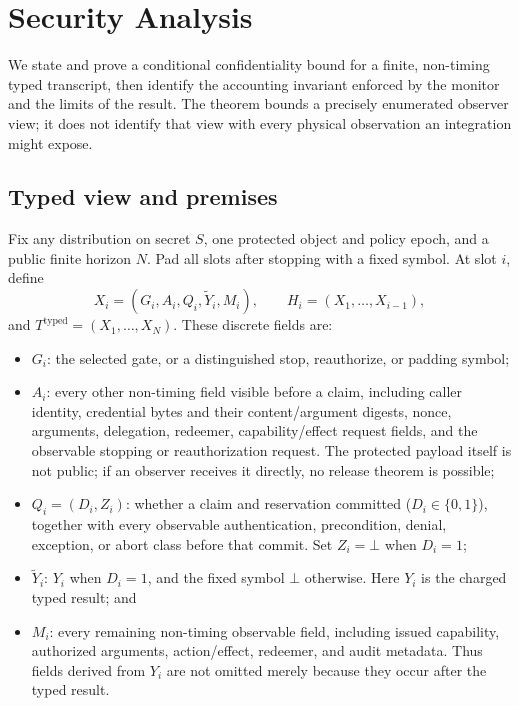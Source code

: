 \documentclass[conference,compsoc]{IEEEtran}
\begin{document}
{

\section{Security Analysis}
\label{sec:proof}

We state and prove a conditional confidentiality bound for a finite,
non-timing typed transcript, then identify the accounting invariant
enforced by the monitor and the limits of the result. The theorem bounds
a precisely enumerated observer view; it does not identify that view
with every physical observation an integration might expose.

\subsection{Typed view and premises}
\label{sec:premises}
\label{app:premises}
Fix any distribution on secret $S$, one protected object and policy epoch,
and a public finite horizon $N$. Pad all slots after stopping with a fixed
symbol. At slot $i$, define
\[
 X_i=(G_i,A_i,Q_i,\widetilde Y_i,M_i),\qquad
 H_i=(X_1,\ldots,X_{i-1}),
\]
and $T^{\mathrm{typed}}=(X_1,\ldots,X_N)$. These discrete fields are:
\begin{itemize}
\item $G_i$: the selected gate, or a distinguished stop, reauthorize, or
  padding symbol;
\item $A_i$: every other non-timing field visible before a claim, including
  caller identity, credential bytes and their content/argument digests,
  nonce, arguments, delegation, redeemer, capability/effect request fields,
  and the observable stopping or reauthorization request. The protected
  payload itself is not public; if an observer receives it directly, no
  release theorem is possible;
\item $Q_i=(D_i,Z_i)$: whether a claim and reservation committed
  ($D_i\in\{0,1\}$), together with every observable authentication,
  precondition, denial, exception, or abort class before that commit.
  Set $Z_i=\bot$ when $D_i=1$;
\item $\widetilde Y_i$: $Y_i$ when $D_i=1$, and the fixed symbol $\bot$
  otherwise. Here $Y_i$ is the charged typed result; and
\item $M_i$: every remaining non-timing observable field, including issued
  capability, authorized arguments, action/effect, redeemer, and audit
  metadata. Thus fields derived from $Y_i$ are not omitted merely because
  they occur after the typed result.

\end{itemize}}
\end{document}
